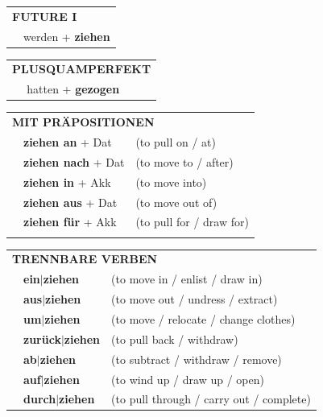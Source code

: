 \documentclass[10pt,a4paper]{revtex4-2}
\begin{document}
\begin{verbbox}
\begin{tabular}{rl}
    \multicolumn{2}{l}{\textbf{FUTURE I} }\\
  &  werden + \textbf{ziehen}\\
 
  \end{tabular}
\hfill
   \begin{tabular}{rl}
      \multicolumn{2}{l}{\textbf{PLUSQUAMPERFEKT}}\\
  &  hatten + \textbf{gezogen}
  \end{tabular}
  


  \vspace{10pt}

   \begin{tabular}{lll}
      \multicolumn{3}{l}{\textbf{MIT PRÄPOSITIONEN}}\\
& \textbf{ziehen an} + Dat & (to pull on / at)\\
& \textbf{ziehen nach} + Dat & (to move to / after)\\
& \textbf{ziehen in} + Akk & (to move into)\\
& \textbf{ziehen aus} + Dat & (to move out of)\\
& \textbf{ziehen für} + Akk & (to pull for / draw for)\\
\vspace{10pt}
  \end{tabular}
  \hfill
   \begin{tabular}{lll}
      \multicolumn{3}{l}{\textbf{TRENNBARE VERBEN}}\\
 & \textbf{ein$|$ziehen} & (to move in / enlist / draw in)\\
 & \textbf{aus$|$ziehen} & (to move out / undress / extract)\\
 & \textbf{um$|$ziehen} & (to move / relocate / change clothes)\\
 & \textbf{zurück$|$ziehen} & (to pull back / withdraw)\\
 & \textbf{ab$|$ziehen} & (to subtract / withdraw / remove)\\
 & \textbf{auf$|$ziehen} & (to wind up / draw up / open)\\
 & \textbf{durch$|$ziehen} & (to pull through / carry out / complete)
  \end{tabular}


  \vspace{-5pt}


\end{verbbox}
\end{document}

